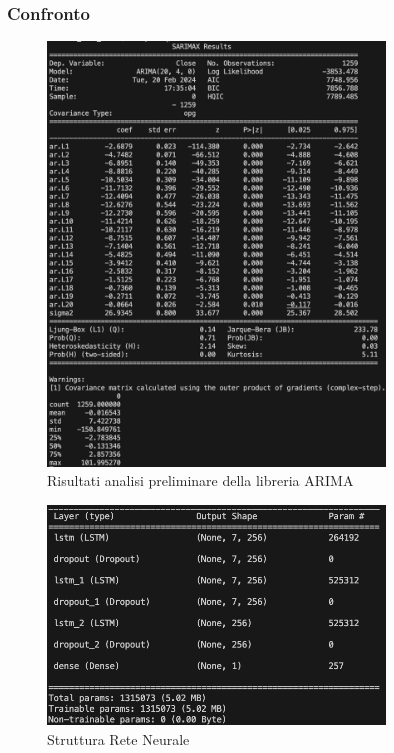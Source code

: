 \documentclass[a4paper,12pt]{article}
\begin{document}
            \subsubsection{Confronto}
            \begin{figure}[H]
                \centering
                \includegraphics[width=0.8\textwidth]{ARIMA3.png}
                \caption{Risultati analisi preliminare della libreria 
                ARIMA}
            \end{figure}
            \begin{figure}[H]
                \centering
                \includegraphics[width=0.8\textwidth]{LSTM3-1.png}
                \caption{Struttura Rete Neurale}
            \end{figure}
\end{document}
